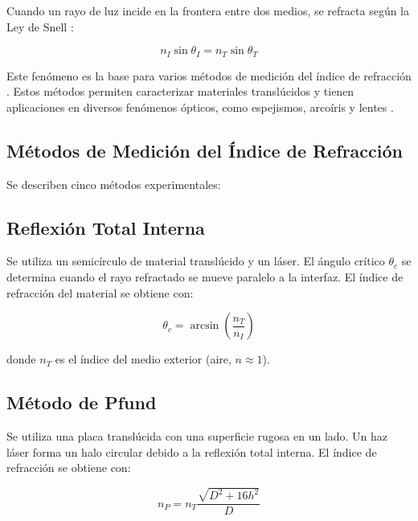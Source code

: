 \documentclass[article,12pt]{elsarticle}
\begin{document}
Cuando un rayo de luz incide en la frontera entre dos medios, se refracta según la Ley de Snell \cite{snell}:

\begin{mdframed}
\begin{equation}
    n_I \sin\theta_I = n_T \sin\theta_T
\end{equation}
\end{mdframed}

Este fenómeno es la base para varios métodos de medición del índice de refracción \cite{indice_ref}. Estos métodos permiten caracterizar materiales translúcidos y tienen aplicaciones en diversos fenómenos ópticos, como espejismos, arcoíris y lentes \cite{indice_ref}.

\subsection*{Métodos de Medición del Índice de Refracción} \cite{indice_ref}
Se describen cinco métodos experimentales:

\subsection{Reflexión Total Interna} \cite{indice_ref}
Se utiliza un semicírculo de material translúcido y un láser. El ángulo crítico $\theta_c$ se determina cuando el rayo refractado se mueve paralelo a la interfaz. El índice de refracción del material se obtiene con:

\begin{mdframed}
\label{RTI}
\begin{equation}
    \theta_c = \arcsin\left(\frac{n_T}{n_I}\right)
\end{equation}
\end{mdframed}

donde $n_T$ es el índice del medio exterior (aire, $n \approx 1$).

\subsection{Método de Pfund} \cite{indice_ref}
Se utiliza una placa translúcida con una superficie rugosa en un lado. Un haz láser forma un halo circular debido a la reflexión total interna. El índice de refracción se obtiene con:

\begin{mdframed}
\label{Pfound}
\begin{equation}
    n_P = n_T \frac{\sqrt{D^2 + 16h^2}}{D}
\end{equation}

\end{mdframed}
\end{document}
